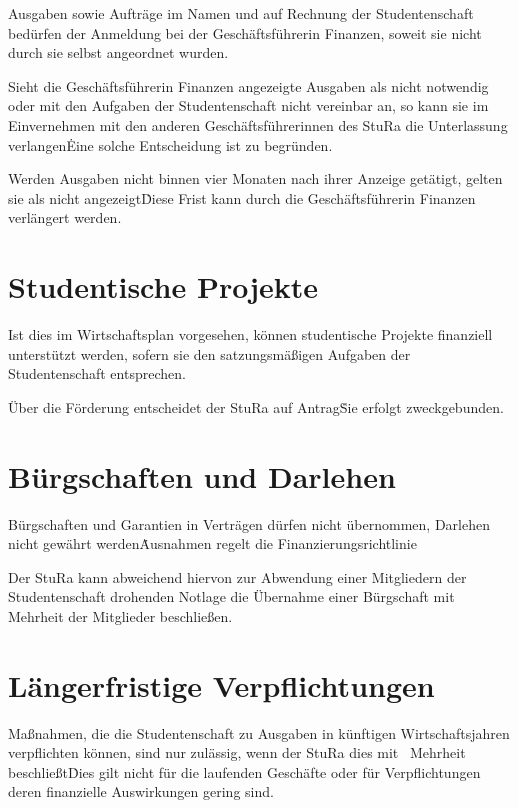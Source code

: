 {\begin{multicols}{2}
\Abs \Satz Ausgaben sowie Aufträge im Namen und auf Rechnung der Studentenschaft bedürfen der Anmeldung bei der Geschäftsführerin Finanzen, soweit sie nicht durch sie selbst angeordnet wurden.

\Abs \Satz Sieht die Geschäftsführerin Finanzen angezeigte Ausgaben als nicht notwendig oder mit den Aufgaben der Studentenschaft nicht vereinbar an, so kann sie im Einvernehmen mit den anderen Geschäftsführerinnen des StuRa die Unterlassung verlangen\. Eine solche Entscheidung ist zu begründen.

\Abs \Satz Werden Ausgaben nicht binnen vier Monaten nach ihrer Anzeige getätigt, gelten sie als nicht angezeigt\. Diese Frist kann durch die Geschäftsführerin Finanzen verlängert werden.



\section{Studentische Projekte}

\Abs \Satz Ist dies im Wirtschaftsplan vorgesehen, können studentische Projekte finanziell unterstützt werden, sofern sie den satzungsmäßigen Aufgaben der Studentenschaft entsprechen.

\Abs \Satz Über die Förderung entscheidet der StuRa auf Antrag\. Sie erfolgt zweckgebunden.



\section{Bürgschaften und Darlehen}

\Abs \Satz Bürgschaften und Garantien in Verträgen dürfen nicht übernommen, Darlehen nicht gewährt werden\. Ausnahmen regelt die Finanzierungsrichtlinie

\Abs \Satz Der StuRa kann abweichend hiervon zur Abwendung einer Mitgliedern der Studentenschaft drohenden Notlage die Übernahme einer Bürgschaft mit Mehrheit der Mitglieder beschließen.



\section{Längerfristige Verpflichtungen}

\Abs \Satz Maßnahmen, die die Studentenschaft zu Ausgaben in künftigen Wirtschaftsjahren verpflichten können, sind nur zulässig, wenn der StuRa dies mit ~Mehrheit beschließt\. Dies gilt nicht für die laufenden Geschäfte oder für Verpflichtungen deren finanzielle Auswirkungen gering sind.




\end{multicols}}
